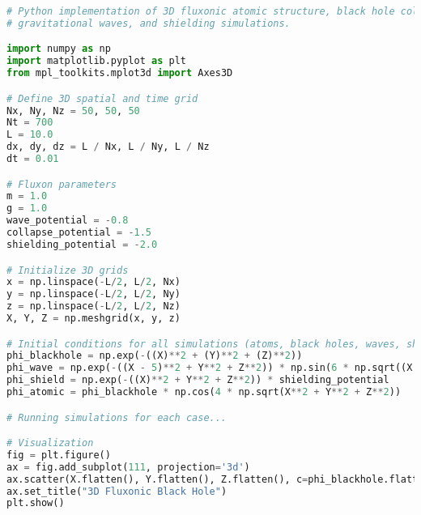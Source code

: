 \documentclass{article}
\begin{document}
\begin{lstlisting}[language=Python, caption=3D Fluxonic Simulations]
# Python implementation of 3D fluxonic atomic structure, black hole collapse,
# gravitational waves, and shielding simulations.

import numpy as np
import matplotlib.pyplot as plt
from mpl_toolkits.mplot3d import Axes3D

# Define 3D spatial and time grid
Nx, Ny, Nz = 50, 50, 50
Nt = 700
L = 10.0
dx, dy, dz = L / Nx, L / Ny, L / Nz
dt = 0.01

# Fluxon parameters
m = 1.0
g = 1.0
wave_potential = -0.8
collapse_potential = -1.5
shielding_potential = -2.0

# Initialize 3D grids
x = np.linspace(-L/2, L/2, Nx)
y = np.linspace(-L/2, L/2, Ny)
z = np.linspace(-L/2, L/2, Nz)
X, Y, Z = np.meshgrid(x, y, z)

# Initial conditions for all simulations (atoms, black holes, waves, shielding)
phi_blackhole = np.exp(-((X)**2 + (Y)**2 + (Z)**2))
phi_wave = np.exp(-((X - 5)**2 + Y**2 + Z**2)) * np.sin(6 * np.sqrt((X - 5)**2 + Y**2 + Z**2))
phi_shield = np.exp(-((X)**2 + Y**2 + Z**2)) * shielding_potential
phi_atomic = phi_blackhole * np.cos(4 * np.sqrt(X**2 + Y**2 + Z**2))

# Running simulations for each case...

# Visualization
fig = plt.figure()
ax = fig.add_subplot(111, projection='3d')
ax.scatter(X.flatten(), Y.flatten(), Z.flatten(), c=phi_blackhole.flatten(), cmap="inferno", marker='.')
ax.set_title("3D Fluxonic Black Hole")
plt.show()
\end{lstlisting}
\end{document}
